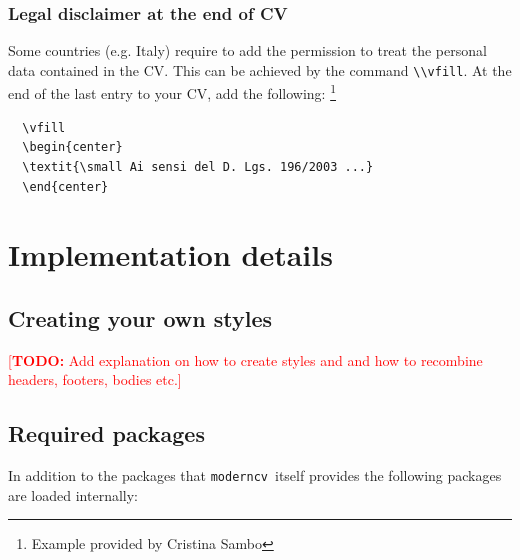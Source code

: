 \documentclass[a4paper,11pt]{article}
\newcommand{\todox}[1]{\textcolor{red}{[\textbf{TODO:} #1]}}
\newcommand{\code}[1]{\lstinline!#1!}
\newcommand{\Code}[1]{\lstinline!#1!~} %
\newcommand{\Moderncv}{\Code{moderncv}}
\begin{document}
\subsubsection{Legal disclaimer at the end of CV}
Some countries (e.g. Italy) require to add the permission to treat the personal data contained in the CV. This can be achieved by the command \code{\\vfill}. At the end of the last entry to your
CV, add the following:%
\footnote{Example provided by Cristina Sambo} %
\begin{lstlisting}
  \vfill
  \begin{center}
  \textit{\small Ai sensi del D. Lgs. 196/2003 ...}
  \end{center}
\end{lstlisting}



\section{Implementation details}
\label{section:implementationDetails}

\subsection{Creating your own styles}
\todox{Add explanation on how to create styles and and how to recombine headers, footers, bodies etc.}

\subsection{Required packages}
\label{section:implementationDetails:requiredPackages}
In addition to the packages that \Moderncv itself provides the following packages are loaded internally:
\end{document}
